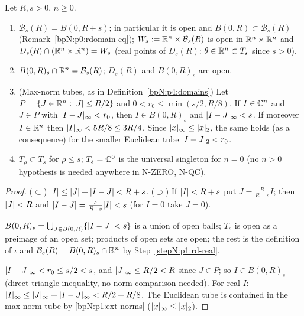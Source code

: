 \begin{lemma}[Domains]\label{bpN:p1:realdomain}
Let $R,s>0$, $n\ge0$.
\begin{enumerate}[label=(\alph*)]
\item $\mathcal B_s(R)=B(0,R+s)$; in particular it is open and $B(0,R)\subset\mathcal B_s(R)$ (Remark~\ref{bpN:p0:rdomain-eq}); $W_s:=\mathbb{R}^n\times\mathcal B_s(R)$ is open in $\mathbb{R}^n\times\mathbb{R}^n$ and
  $D_s(R)\cap(\mathbb{R}^n\times\mathbb{R}^n)=W_s$ (real points of $D_s(R)$: $\theta\in\mathbb{R}^n\subset T_s$ since $s>0$).
\item $B(0,R)_s\cap\mathbb{R}^n=\mathcal B_s(R)$; $D_s(R)$ and $B(0,R)_s$ are open.
\item (Max-norm tubes, as in Definition~\ref{bpN:p4:domains}) Let $P=\{J\in\mathbb{R}^n:\lvert J\rvert\le R/2\}$ and $0<r_0\le\min(s/2,R/8)$. If $I\in\mathbb{C}^n$ and $J\in P$ with $\lvert I-J\rvert_\infty<r_0$, then $I\in B(0,R)_s$ and
  $\lvert I-J\rvert_\infty<s$. If moreover $I\in\mathbb{R}^n$ then $\lvert I\rvert_\infty<5R/8\le3R/4$. Since $\lvert x\rvert_\infty\le\lvert x\rvert_2$, the same holds (as a consequence) for the smaller Euclidean tube $\lvert I-J\rvert_2<r_0$.
\item $T_{\rho}\subset T_s$ for $\rho\le s$; $T_s=\mathbb{C}^0$ is the universal singleton for $n=0$ (no $n>0$ hypothesis is needed anywhere in N-ZERO, N-QC).
\end{enumerate}
\end{lemma}
\begin{proof}
\label{stepN:p1:rd-real} ($\subset$) $\lvert I\rvert\le\lvert J\rvert+\lvert I-J\rvert<R+s$. ($\supset$) If $\lvert I\rvert<R+s$ put $J=\frac R{R+s}I$; then $\lvert J\rvert<R$ and $\lvert I-J\rvert=\frac s{R+s}\lvert I\rvert<s$ (for $I=0$ take $J=0$).

\label{stepN:p1:rd-open} $B(0,R)_s=\bigcup_{J\in B(0,R)}\{\lvert I-J\rvert<s\}$ is a union of open balls; $T_s$ is open as a preimage of an open set; products of open sets are open; the rest is the definition of $\iota$ and $\mathcal B_s(R)=B(0,R)_s\cap\mathbb{R}^n$ by Step~\ref{stepN:p1:rd-real}.

\label{stepN:p1:rd-euclid} $\lvert I-J\rvert_\infty<r_0\le s/2<s$, and $\lvert J\rvert_\infty\le R/2<R$ since $J\in P$; so $I\in B(0,R)_s$ (direct triangle inequality, no norm comparison needed). For real $I$: $\lvert I\rvert_\infty\le\lvert J\rvert_\infty+\lvert I-J\rvert_\infty<R/2+R/8$. The Euclidean tube is contained in the max-norm tube by \ref{bpN:p1:ext-norms} ($\lvert x\rvert_\infty\le\lvert x\rvert_2$).
\end{proof}

